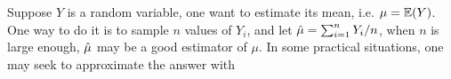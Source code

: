 \documentclass{iitthesis}
\theoremstyle{definition}
\begin{document}
 Suppose $Y$ is a random variable, one want to estimate its mean, i.e. $\mu=\mathbb{E}(Y)$. One way to do it is to sample $n$ values of $Y_i$, and let $\hat{\mu}=\sum_{i=1}^n Y_i/n$, when $n$ is large enough, $\hat{\mu}$ may be a good estimator of $\mu$. In some practical situations, one may seek to approximate the answer with 
%
\end{document}

